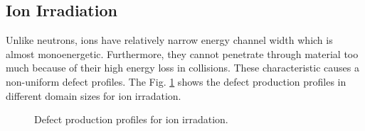 \documentclass[a4paper]{article}
\begin{document}
  \subsection{Ion Irradiation} \hspace{10pt}
  Unlike neutrons, ions have relatively narrow energy channel width which is almost monoenergetic. Furthermore, they cannot penetrate through material too much because of their high energy loss in collisions. These characteristic causes a non-uniform defect profiles. The Fig. \ref{figure:defect_production_500-5000nm} shows the defect production profiles in different domain sizes for ion irradation.
    \begin{figure}[h!]  %
      \centering
      \qquad
      \caption{Defect production profiles for ion irradation.}
      \label{figure:defect_production_500-5000nm}
    \end{figure}
    \newpage
\end{document}
